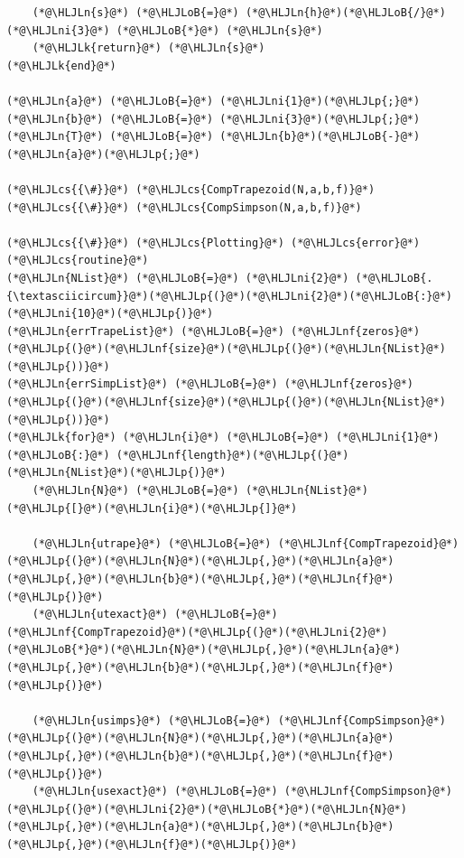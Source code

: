\documentclass[12pt,a4paper]{article}
\newcommand{\HLJLk}[1]{\textcolor[RGB]{148,91,176}{\textbf{#1}}}
\newcommand{\HLJLn}[1]{#1}
\newcommand{\HLJLnf}[1]{\textcolor[RGB]{66,102,213}{#1}}
\newcommand{\HLJLni}[1]{\textcolor[RGB]{59,151,46}{#1}}
\newcommand{\HLJLoB}[1]{\textcolor[RGB]{102,102,102}{\textbf{#1}}}
\newcommand{\HLJLp}[1]{#1}
\newcommand{\HLJLcs}[1]{\textcolor[RGB]{153,153,119}{\textit{#1}}}
\begin{document}
\begin{lstlisting}
    (*@\HLJLn{s}@*) (*@\HLJLoB{=}@*) (*@\HLJLn{h}@*)(*@\HLJLoB{/}@*)(*@\HLJLni{3}@*) (*@\HLJLoB{*}@*) (*@\HLJLn{s}@*)
    (*@\HLJLk{return}@*) (*@\HLJLn{s}@*)
(*@\HLJLk{end}@*)

(*@\HLJLn{a}@*) (*@\HLJLoB{=}@*) (*@\HLJLni{1}@*)(*@\HLJLp{;}@*) (*@\HLJLn{b}@*) (*@\HLJLoB{=}@*) (*@\HLJLni{3}@*)(*@\HLJLp{;}@*) (*@\HLJLn{T}@*) (*@\HLJLoB{=}@*) (*@\HLJLn{b}@*)(*@\HLJLoB{-}@*)(*@\HLJLn{a}@*)(*@\HLJLp{;}@*)

(*@\HLJLcs{{\#}}@*) (*@\HLJLcs{CompTrapezoid(N,a,b,f)}@*)
(*@\HLJLcs{{\#}}@*) (*@\HLJLcs{CompSimpson(N,a,b,f)}@*)

(*@\HLJLcs{{\#}}@*) (*@\HLJLcs{Plotting}@*) (*@\HLJLcs{error}@*) (*@\HLJLcs{routine}@*)
(*@\HLJLn{NList}@*) (*@\HLJLoB{=}@*) (*@\HLJLni{2}@*) (*@\HLJLoB{.{\textasciicircum}}@*)(*@\HLJLp{(}@*)(*@\HLJLni{2}@*)(*@\HLJLoB{:}@*)(*@\HLJLni{10}@*)(*@\HLJLp{)}@*)
(*@\HLJLn{errTrapeList}@*) (*@\HLJLoB{=}@*) (*@\HLJLnf{zeros}@*)(*@\HLJLp{(}@*)(*@\HLJLnf{size}@*)(*@\HLJLp{(}@*)(*@\HLJLn{NList}@*)(*@\HLJLp{))}@*)
(*@\HLJLn{errSimpList}@*) (*@\HLJLoB{=}@*) (*@\HLJLnf{zeros}@*)(*@\HLJLp{(}@*)(*@\HLJLnf{size}@*)(*@\HLJLp{(}@*)(*@\HLJLn{NList}@*)(*@\HLJLp{))}@*)
(*@\HLJLk{for}@*) (*@\HLJLn{i}@*) (*@\HLJLoB{=}@*) (*@\HLJLni{1}@*) (*@\HLJLoB{:}@*) (*@\HLJLnf{length}@*)(*@\HLJLp{(}@*)(*@\HLJLn{NList}@*)(*@\HLJLp{)}@*)
    (*@\HLJLn{N}@*) (*@\HLJLoB{=}@*) (*@\HLJLn{NList}@*)(*@\HLJLp{[}@*)(*@\HLJLn{i}@*)(*@\HLJLp{]}@*)

    (*@\HLJLn{utrape}@*) (*@\HLJLoB{=}@*) (*@\HLJLnf{CompTrapezoid}@*)(*@\HLJLp{(}@*)(*@\HLJLn{N}@*)(*@\HLJLp{,}@*)(*@\HLJLn{a}@*)(*@\HLJLp{,}@*)(*@\HLJLn{b}@*)(*@\HLJLp{,}@*)(*@\HLJLn{f}@*)(*@\HLJLp{)}@*)
    (*@\HLJLn{utexact}@*) (*@\HLJLoB{=}@*) (*@\HLJLnf{CompTrapezoid}@*)(*@\HLJLp{(}@*)(*@\HLJLni{2}@*)(*@\HLJLoB{*}@*)(*@\HLJLn{N}@*)(*@\HLJLp{,}@*)(*@\HLJLn{a}@*)(*@\HLJLp{,}@*)(*@\HLJLn{b}@*)(*@\HLJLp{,}@*)(*@\HLJLn{f}@*)(*@\HLJLp{)}@*)

    (*@\HLJLn{usimps}@*) (*@\HLJLoB{=}@*) (*@\HLJLnf{CompSimpson}@*)(*@\HLJLp{(}@*)(*@\HLJLn{N}@*)(*@\HLJLp{,}@*)(*@\HLJLn{a}@*)(*@\HLJLp{,}@*)(*@\HLJLn{b}@*)(*@\HLJLp{,}@*)(*@\HLJLn{f}@*)(*@\HLJLp{)}@*)
    (*@\HLJLn{usexact}@*) (*@\HLJLoB{=}@*) (*@\HLJLnf{CompSimpson}@*)(*@\HLJLp{(}@*)(*@\HLJLni{2}@*)(*@\HLJLoB{*}@*)(*@\HLJLn{N}@*)(*@\HLJLp{,}@*)(*@\HLJLn{a}@*)(*@\HLJLp{,}@*)(*@\HLJLn{b}@*)(*@\HLJLp{,}@*)(*@\HLJLn{f}@*)(*@\HLJLp{)}@*)


\end{lstlisting}
\end{document}
